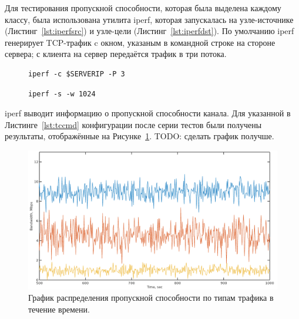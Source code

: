 		Для тестирования пропускной способности, которая была выделена каждому классу,
		была использована утилита iperf, которая запускалась на узле-источнике (Листинг~\ref{lst:iperfsrc}) и
		узле-цели (Листинг~\ref{lst:iperfdst}). По умолчанию iperf генерирует TCP-трафик c окном,
		указаным в командной строке на стороне сервера; с клиента на сервер передаётся трафик в три потока.

        \begin{figure}[ht!]
    		\center
    		\begin{lstlisting}[frame=lines,
    						  caption={Команда iperf на узле-источнике (клиентская сторона).},
    						  label={lst:iperfsrc}]
iperf -c $SERVERIP -P 3
    		\end{lstlisting}
        \end{figure}	

        \begin{figure}[ht!]
    		\center
    		\begin{lstlisting}[frame=lines,
    						  caption={Команда iperf на узле-цели (серверная сторона).},
    						  label={lst:iperfdst}]
iperf -s -w 1024
    		\end{lstlisting}
        \end{figure}

		iperf выводит информацию о пропускной способности канала. Для указанной в Листинге~\ref{lst:tccmd}
		конфигурации после серии тестов были получены результаты, отображённые на Рисунке~\ref{pic:plot}.
		TODO: сделать график получше.

        \begin{figure}[ht!]
        	\center
        	\includegraphics[scale=0.4]{plot.png}
        	\caption{График распределения пропускной способности по типам трафика в течение времени.}
			\label{pic:plot}
        \end{figure}

